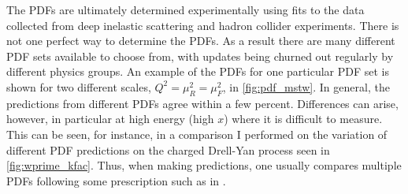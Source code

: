 The PDFs are ultimately determined experimentally using fits to the 
data collected from deep inelastic scattering and hadron
collider experiments. There is not one perfect way 
to determine the PDFs.  As a result there are many different
PDF sets available to choose from, with updates being churned
out regularly by different physics groups. An example of the
PDFs for one particular PDF set is shown for two different
scales, $Q^2=\mu_R^2=\mu_F^2$, in \fig\ref{fig:pdf_mstw}.
In general, the predictions from different PDFs agree within a few percent.
Differences can arise, however, in particular at high energy (high $x$)
where it is difficult to measure.
This can be seen, for instance, in a comparison I performed
on the variation of different PDF predictions on the charged Drell-Yan process
seen in \fig\ref{fig:wprime_kfac}.
Thus, when making predictions, one usually compares multiple
PDFs following some prescription such as in \cite{Botje:2011sn}.




